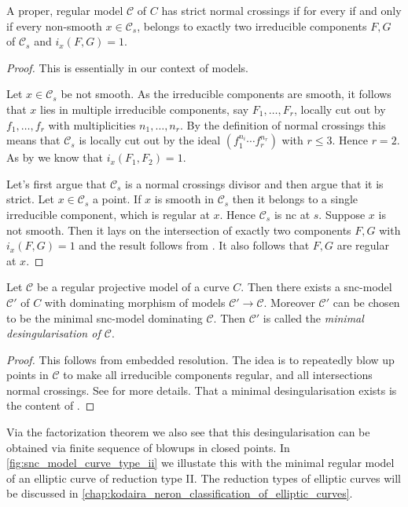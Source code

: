 \begin{proposition}
	A proper, regular model $\mathscr C$ of $C$ has strict normal crossings if for every if and only if every non-smooth $x \in \mathscr C_s$, belongs to exactly two irreducible components $F, G$ of $\mathscr C_s$ and $i_x(F, G) = 1$.  
\end{proposition}
\begin{proof}
	This is essentially \cite[prop.\ 9.1.8.(b)]{liuAlgebraicGeometryArithmetic2002} in our context of models. 

	\ltr Let $x \in \mathscr C_s$ be not smooth. 
	As the irreducible components are smooth, it follows that $x$ lies in multiple irreducible components, say $F_1, \ldots, F_r$, locally cut out by $f_1, \ldots, f_r$ with multiplicities $n_1, \ldots, n_r$. 
	By the definition of normal crossings this means that  $\mathscr C_s$ is locally cut out by the ideal $(f_1^{n_i}\cdots f_r^{n_r})$ with $r \le 3$. Hence  $r = 2$. 
	As by \cite[prop.\ 9.1.8.(b)]{liuAlgebraicGeometryArithmetic2002} we know that $i_x(F_1, F_2) = 1$. 

	\rtl Let's first argue that $\mathscr C_s$ is a normal crossings divisor and then argue that it is strict.
	Let $x \in \mathscr C_s$ a point. If $x$ is smooth in $\mathscr C_s$ then it belongs to a single irreducible component, which is regular at $x$. 
	Hence $\mathscr C_s$ is nc at $s$. 
	Suppose  $x$ is not smooth. Then it lays on the intersection of exactly two components $F, G$ with $i_x(F, G) = 1$ and the result follows from \cite[prop.\ 9.1.8.(b)]{liuAlgebraicGeometryArithmetic2002}.
	It also follows that $F, G$ are regular at $x$.
\end{proof}

\begin{theorem}\label{thm:desingularisation}
	Let $\mathscr C$ be a regular projective model of a curve $C$.
	Then there exists a snc-model $\mathscr C'$ of $C$ with dominating morphism of models $\mathscr C' \to \mathscr C$. 
	Moreover $\mathscr C'$ can be chosen to be the minimal snc-model dominating $\mathscr C$. 
	Then $\mathscr C'$ is called the \emph{minimal desingularisation of $\mathscr C$}. 
\end{theorem}
\begin{proof}
	This follows from embedded resolution. 
	The idea is to repeatedly blow up points in $\mathscr C$ to make all irreducible components regular, and all intersections normal crossings. 
	See \cite[sec.\ 9.2.4]{liuAlgebraicGeometryArithmetic2002} for more details.
	That a minimal desingularisation exists is the content of \cite[prop.\ 9.3.32]{liuAlgebraicGeometryArithmetic2002}.
\end{proof}
Via the factorization theorem we also see that this desingularisation can be obtained via finite sequence of blowups in closed points. 
In \cref{fig:snc_model_curve_type_ii} we illustate this with the minimal regular model of an elliptic curve of reduction type II. 
The reduction types of elliptic curves will be discussed in \cref{chap:kodaira_neron_classification_of_elliptic_curves}.


